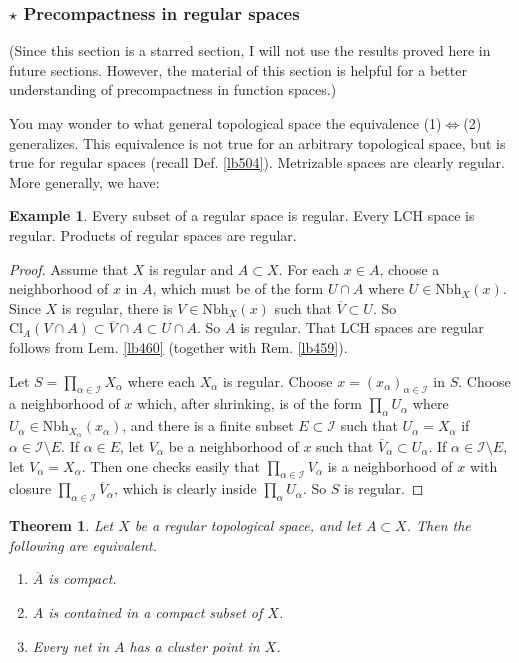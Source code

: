 \documentclass[12pt,b5paper,notitlepage]{article}
\theoremstyle{definition}
\newtheorem{eg}[df]{Example}
\theoremstyle{plain}
\newtheorem{thm}[df]{Theorem}
\newcommand{\ovl}{\overline}
\newcommand{\scr}{\mathscr}
\newcommand{\Nbh}{\mathrm{Nbh}}
\newcommand{\Cl}{\mathrm{Cl}}
\numberwithin{equation}{section}
\begin{document}
\subsubsection{$\star$ Precompactness in regular spaces}

(Since this section is a starred section, I will not use the results proved here in future sections. However, the material of this section is helpful for a better understanding of precompactness in function spaces.)

You may wonder to what general topological space the equivalence (1)$\Leftrightarrow$(2) generalizes. This equivalence is not true for an arbitrary topological space, but is true for regular spaces (recall Def. \ref{lb504}). Metrizable spaces are clearly regular. More generally, we have:

\begin{eg}\label{lb506}
Every subset of a regular space is regular. Every LCH space is regular. Products of regular spaces are regular.
\end{eg}

\begin{proof}%
Assume that $X$ is regular and $A\subset X$. For each $x\in A$, choose a neighborhood of $x$ in $A$, which must be of the form $U\cap A$ where $U\in\Nbh_X(x)$. Since $X$ is regular, there is $V\in\Nbh_X(x)$ such that $\ovl V\subset U$. So $\Cl_A(V\cap A)\subset \ovl V\cap A\subset U\cap A$. So $A$ is regular. That LCH spaces are regular follows from Lem. \ref{lb460} (together with Rem. \ref{lb459}).

Let $S=\prod_{\alpha\in\scr I}X_\alpha$ where each $X_\alpha$ is regular. Choose $x=(x_\alpha)_{\alpha\in\scr I}$ in $S$. Choose a neighborhood of $x$ which, after shrinking, is of the form $\prod_\alpha U_\alpha$ where $U_\alpha\in\Nbh_{X_\alpha}(x_\alpha)$, and there is a finite subset $E\subset\scr I$ such that $U_\alpha=X_\alpha$ if $\alpha\in\scr I\setminus E$. If $\alpha\in E$, let $V_\alpha$ be a neighborhood of $x$ such that $\ovl V_\alpha\subset U_\alpha$. If $\alpha\in\scr I\setminus E$, let $V_\alpha=X_\alpha$. Then one checks easily that $\prod_{\alpha\in\scr I} V_\alpha$ is a neighborhood of $x$ with closure $\prod_{\alpha\in\scr I} \ovl V_\alpha$, which is clearly inside $\prod_\alpha U_\alpha$. So $S$ is regular.
\end{proof}


\begin{thm}\label{lb507}
Let $X$ be a regular topological space, and let $A\subset X$. Then the following are equivalent.
\begin{enumerate}[label=(\arabic*)]
\item $\ovl A$ is compact.
\item $A$ is contained in a compact subset of $X$.
\item Every net in $A$ has a cluster point in $X$.
\end{enumerate}
\end{thm}
\end{document}
